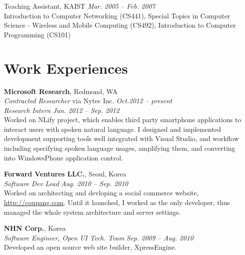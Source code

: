 \documentclass[margin,line]{res}
\begin{document}
\begin{resume}
Teaching Assistant, KAIST \hfill{\it Mar. 2005 -- Feb. 2007} \\
Introduction to Computer Networking (CS441), Special Topics in Computer Science - Wireless and Mobile Computing (CS492), Introduction to Computer Programming (CS101)


\section{\sc Work Experiences}
{\bf Microsoft Research}, Redmond, WA \\
{\em Contracted Researcher} via Nytec Inc. \hfill {\it Oct.2012 -- present} \\
{\em Research Intern} \hfill {\it Jun. 2012 -- Sep. 2012} \\
Worked on NLify project, which enables third party smartphone applications to
interact users with spoken natural language. I designed and implemented
development supporting tools well integrated with Visual Studio, and workflow
including specifying spoken language usages, amplifying them, and converting
into WindowsPhone application control.

{\bf Forward Ventures LLC.}, Seoul, Korea \\
{\em Software Dev Lead} \hfill {\it Aug. 2010 -- Sep. 2010} \\
Worked on architecting and devloping a social commerce website,
\url{http://coupang.com}. Until it launched, I worked as the only developer, thus managed 
the whole system architecture and server settings.

{\bf NHN Corp.}, Korea \\
{\em Software Engineer, Open UI Tech. Team} \hfill {\it Sep. 2009 -- Aug. 2010}\\
Developed an open source web site builder, XpressEngine.


\end{resume}
\end{document}
